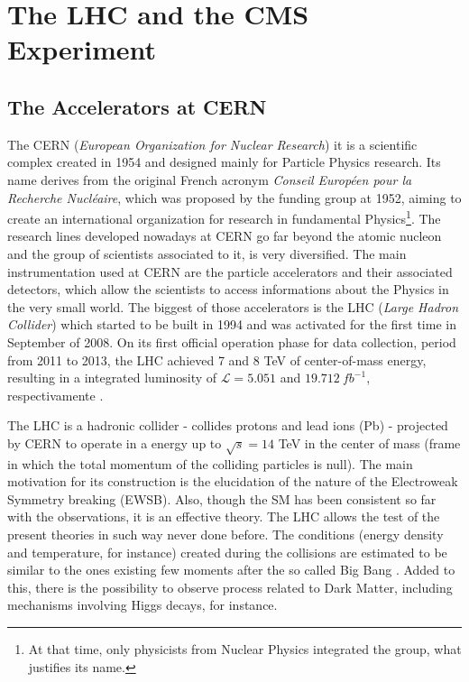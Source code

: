 \chapter{The LHC and the CMS Experiment}

\section{The Accelerators at CERN}
The CERN (\textit{European Organization for Nuclear Research}) it is a scientific complex created in 1954 and designed mainly for Particle Physics research. Its name derives from the original French acronym \textit{Conseil Européen pour la Recherche Nucléaire}, which was proposed by the funding group at 1952, aiming to create an international organization for research in fundamental Physics\footnote{At that time, only physicists from Nuclear Physics integrated the group, what justifies its name.}. The research lines developed nowadays at CERN go far beyond the atomic nucleon and the group of scientists associated to it, is very diversified. The main instrumentation used at CERN are the particle accelerators and their associated detectors, which allow the scientists to access informations about the Physics in the very small world. The biggest of those accelerators is the LHC (\textit{Large Hadron Collider}) which started to be built in 1994 and was activated for the first time in September of 2008. On its first official operation phase for data collection, period from 2011 to 2013, the LHC achieved 7 and 8 TeV of center-of-mass energy, resulting in a integrated luminosity of $\mathcal{L} = 5.051$ and $19.712~fb^{-1}$, respectivamente \cite{bib:web-cern}.

The LHC is a hadronic collider - collides protons and lead ions (Pb) - projected by CERN to operate in a energy up to $\sqrt{s}=14$ TeV in the center of mass (frame in which the total momentum of the colliding particles is null). The main motivation for its construction is the elucidation of the nature of the Electroweak Symmetry breaking (EWSB). Also, though the SM has been consistent so far with the observations, it is an effective theory. The LHC allows the test of the present theories in such way never done before. The conditions (energy density and temperature, for instance) created during the collisions are estimated to be similar to the ones existing few moments after the so called Big Bang \cite{bib:lhc-guide}. Added to this, there is the possibility to observe process related to Dark Matter, including mechanisms involving Higgs decays, for instance. 

